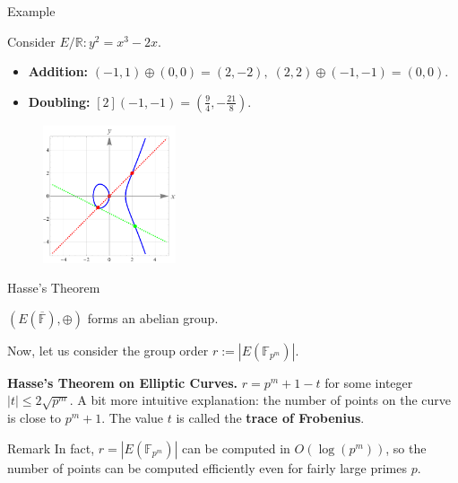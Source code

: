\documentclass{beamer}
\begin{document}
    \begin{frame}{Example}
        \begin{example}
        Consider $E/\mathbb{R}: y^2=x^3-2x$. 
        \begin{itemize}
            \item \textbf{Addition:} $(-1,1) \oplus (0,0) = (2,-2), \; (2,2) \oplus (-1,-1) = (0,0)$.
            \item \textbf{Doubling:} $[2](-1,-1) = \left(\frac{9}{4},-\frac{21}{8}\right)$. 
        \end{itemize}
        \begin{figure}
            \centering
            \includegraphics[width=0.35\textwidth]{images/lecture_3/ec_illustration_6.pdf}
            \label{fig:ec_6}
        \end{figure}
        \end{example}
    \end{frame}

    \begin{frame}{Hasse's Theorem}
        \begin{theorem}
            $(E(\overline{\mathbb{F}}),\oplus)$ forms an abelian group. \pause
        \end{theorem}
        \vspace{10px}

        Now, let us consider the group order $r := |E(\mathbb{F}_{p^m})|$. \pause

        \begin{theorem}
            \textbf{Hasse's Theorem on Elliptic Curves.} $r = p^m + 1 - t$ for some integer $|t| \leq 2\sqrt{p^m}$. A bit more intuitive explanation: the number of points on the curve is close to $p^m+1$. The value $t$ is called the \textbf{trace of Frobenius}.\pause
        \end{theorem}
        
        \begin{block}{Remark}
            In fact, $r=|E(\mathbb{F}_{p^m})|$ can be computed in $O(\log(p^m))$, so the number of points can be computed efficiently even for fairly large primes $p$.
        \end{block}
    \end{frame}
\end{document}
